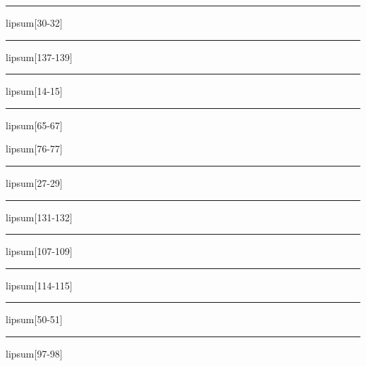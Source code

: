 \documentclass[11pt,a4paper]{article}
\begin{document}
\begin{simplewrap}
  \textcolor{purple!55}{\rule{5.0cm}{9.7cm}}
\end{simplewrap}
lipsum[30-32]

\begin{simplewrap}
  \textcolor{magenta!40}{\rule{4.7cm}{9.5cm}}
\end{simplewrap}
lipsum[137-139]

\begin{simplewrap}
  \textcolor{olive!10}{\rule{4.6cm}{2.2cm}}
\end{simplewrap}
lipsum[14-15]

\begin{simplewrap}
  \textcolor{yellow!27}{\rule{5.3cm}{3.3cm}}
\end{simplewrap}
lipsum[65-67]

lipsum[76-77]

\begin{simplewrap}
  \textcolor{yellow!58}{\rule{4.6cm}{4.9cm}}
\end{simplewrap}
lipsum[27-29]

\begin{simplewrap}
  \textcolor{magenta!24}{\rule{5.2cm}{6.5cm}}
\end{simplewrap}
lipsum[131-132]

\begin{simplewrap}
  \textcolor{violet!54}{\rule{5.0cm}{9.4cm}}
\end{simplewrap}
lipsum[107-109]

\begin{simplewrap}
  \textcolor{brown!45}{\rule{3.2cm}{7.9cm}}
\end{simplewrap}
lipsum[114-115]

\begin{simplewrap}
  \textcolor{lime!58}{\rule{4.8cm}{7.9cm}}
\end{simplewrap}
lipsum[50-51]

\begin{simplewrap}
  \textcolor{cyan!53}{\rule{3.2cm}{9.7cm}}
\end{simplewrap}
lipsum[97-98]
\end{document}
